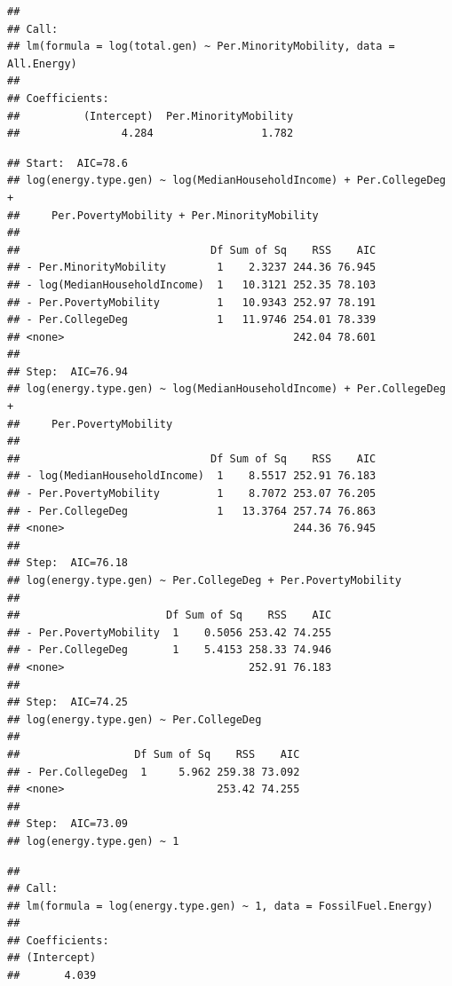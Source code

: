 \documentclass[
  12pt,
]{article}
\begin{document}
\begin{verbatim}
## 
## Call:
## lm(formula = log(total.gen) ~ Per.MinorityMobility, data = All.Energy)
## 
## Coefficients:
##          (Intercept)  Per.MinorityMobility  
##                4.284                 1.782
\end{verbatim}

\begin{verbatim}
## Start:  AIC=78.6
## log(energy.type.gen) ~ log(MedianHouseholdIncome) + Per.CollegeDeg + 
##     Per.PovertyMobility + Per.MinorityMobility
## 
##                              Df Sum of Sq    RSS    AIC
## - Per.MinorityMobility        1    2.3237 244.36 76.945
## - log(MedianHouseholdIncome)  1   10.3121 252.35 78.103
## - Per.PovertyMobility         1   10.9343 252.97 78.191
## - Per.CollegeDeg              1   11.9746 254.01 78.339
## <none>                                    242.04 78.601
## 
## Step:  AIC=76.94
## log(energy.type.gen) ~ log(MedianHouseholdIncome) + Per.CollegeDeg + 
##     Per.PovertyMobility
## 
##                              Df Sum of Sq    RSS    AIC
## - log(MedianHouseholdIncome)  1    8.5517 252.91 76.183
## - Per.PovertyMobility         1    8.7072 253.07 76.205
## - Per.CollegeDeg              1   13.3764 257.74 76.863
## <none>                                    244.36 76.945
## 
## Step:  AIC=76.18
## log(energy.type.gen) ~ Per.CollegeDeg + Per.PovertyMobility
## 
##                       Df Sum of Sq    RSS    AIC
## - Per.PovertyMobility  1    0.5056 253.42 74.255
## - Per.CollegeDeg       1    5.4153 258.33 74.946
## <none>                             252.91 76.183
## 
## Step:  AIC=74.25
## log(energy.type.gen) ~ Per.CollegeDeg
## 
##                  Df Sum of Sq    RSS    AIC
## - Per.CollegeDeg  1     5.962 259.38 73.092
## <none>                        253.42 74.255
## 
## Step:  AIC=73.09
## log(energy.type.gen) ~ 1
\end{verbatim}

\begin{verbatim}
## 
## Call:
## lm(formula = log(energy.type.gen) ~ 1, data = FossilFuel.Energy)
## 
## Coefficients:
## (Intercept)  
##       4.039
\end{verbatim}
\end{document}
